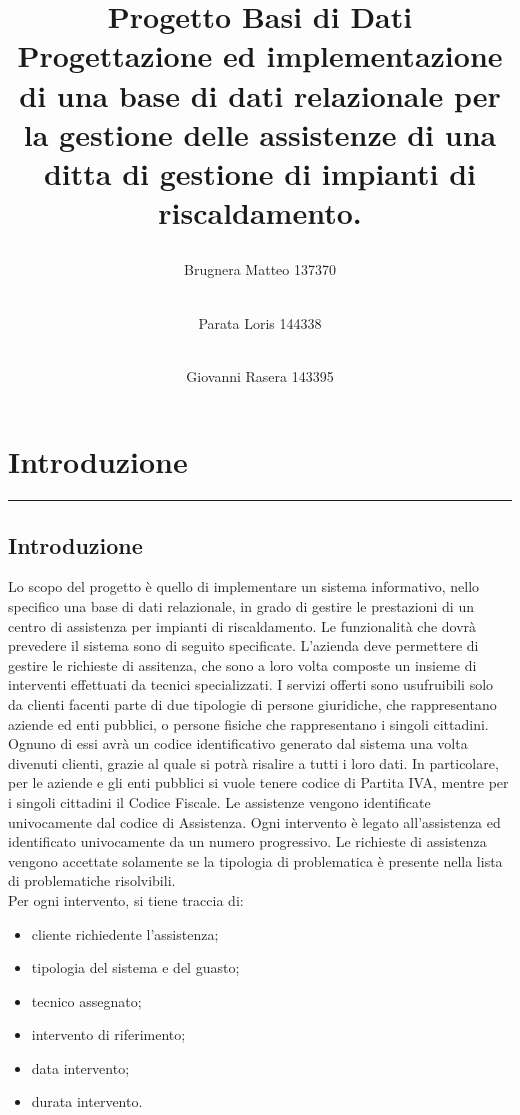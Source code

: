 \documentclass[legalpaper]{article}
\begin{document}
\title{%
\raggedright \textbf{Progetto Basi di Dati} \\ \large \bigskip Progettazione ed implementazione di una base di dati relazionale per la gestione delle assistenze di una ditta di gestione di impianti di riscaldamento.}
\maketitle

\begin{flushleft}
\author{Brugnera Matteo 137370 \and \\ Parata Loris 144338 \and \\ Giovanni Rasera 143395}

\end{flushleft}


\newpage
\tableofcontents

\newpage
\section{Introduzione}
\rule{\linewidth}{1.5pt}
\subsection{Introduzione}
Lo scopo del progetto è quello di implementare un sistema informativo, nello specifico una base di dati relazionale, in grado di gestire le prestazioni di un centro di assistenza per impianti di riscaldamento. 
Le funzionalità che dovrà prevedere il sistema sono di seguito specificate.
L'azienda deve permettere di gestire le richieste di assitenza, che sono a loro volta composte un insieme di interventi effettuati da tecnici specializzati.
I servizi offerti sono usufruibili solo da clienti facenti parte di due tipologie di persone giuridiche, che rappresentano aziende ed enti pubblici, o persone fisiche che rappresentano i singoli cittadini.
Ognuno di essi avrà un codice identificativo generato dal sistema una volta divenuti clienti, grazie al quale si potrà risalire a tutti i loro dati. 
In particolare, per le aziende e gli enti pubblici si vuole tenere codice di Partita IVA, mentre per i singoli cittadini il Codice Fiscale.
Le assistenze vengono identificate univocamente dal codice di Assistenza. Ogni intervento è legato all'assistenza ed identificato univocamente da un numero progressivo. 
Le richieste di assistenza vengono accettate solamente se la tipologia di problematica è presente nella lista di problematiche risolvibili. \\
Per ogni intervento, si tiene traccia di:
\medskip
\begin{itemize}
    \item cliente richiedente l'assistenza;
    \item tipologia del sistema e del guasto;
    \item tecnico assegnato;
    \item intervento di riferimento;
    \item data intervento;
    \item durata intervento.
\end{itemize}
\end{document}
